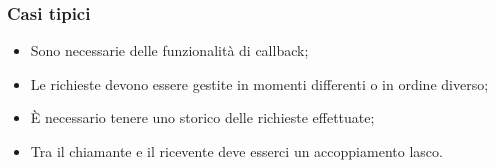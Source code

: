 \subsubsection{Casi tipici}
\begin{itemize}
\item Sono necessarie delle funzionalità di callback;
\item Le richieste devono essere gestite in momenti differenti o in ordine diverso;
\item \`{E} necessario tenere uno storico delle richieste effettuate;
\item Tra il chiamante e il ricevente deve esserci un accoppiamento lasco.
\end{itemize}